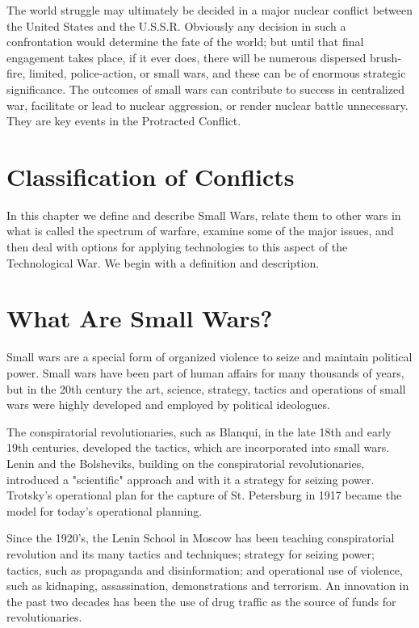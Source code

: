 The world struggle may ultimately be decided in a major nuclear conflict between the United States and the U.S.S.R. Obviously any decision in such a confrontation would determine the fate of the world; but until that final engagement takes place, if it ever does, there will be numerous dispersed brush-fire, limited, police-action, or small wars, and these can be of enormous strategic significance. The outcomes of small wars can contribute to success in centralized war, facilitate or lead to nuclear aggression, or render nuclear battle unnecessary. They are key events in the Protracted Conflict.

\section{Classification of Conflicts}
In this chapter we define and describe Small Wars, relate them to other wars in what is called the spectrum of warfare, examine some of the major issues, and then deal with options for applying technologies to this aspect of the Technological War. We begin with a definition and description.

\section{What Are Small Wars?}
Small wars are a special form of organized violence to seize and maintain political power. Small wars have been part of human affairs for many thousands of years, but in the 20th century the art, science, strategy, tactics and operations of small wars were highly developed and employed by political ideologues.

The conspiratorial revolutionaries, such as Blanqui, in the late 18th and early 19th centuries, developed the tactics, which are incorporated into small wars. Lenin and the Bolsheviks, building on the conspiratorial revolutionaries, introduced a "scientific" approach and with it a strategy for seizing power. Trotsky's operational plan for the capture of St. Petersburg in 1917 became the model for today's operational planning.

Since the 1920's, the Lenin School in Moscow has been teaching conspiratorial revolution and its many tactics and techniques; strategy for seizing power; tactics, such as propaganda and disinformation; and operational use of violence, such as kidnaping, assassination, demonstrations and terrorism. An innovation in the past two decades has been the use of drug traffic as the source of funds for revolutionaries.

